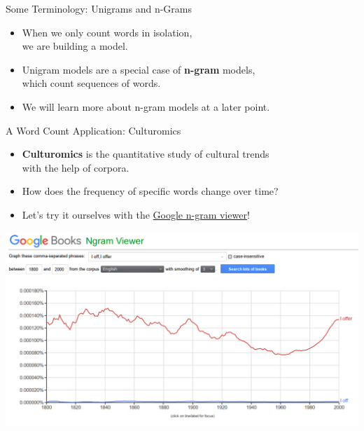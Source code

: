 \documentclass[professionalfonts, xcolor={usenames,svgnames,x11names,table}]{beamer}
\begin{document}
\begin{frame}{Some Terminology: Unigrams and n-Grams}
    \begin{itemize}
        \item When we only count words in isolation,\\
              we are building a  model.
        \item Unigram models are a special case of \textbf{n-gram} models,\\
              which count sequences of words.
        \item We will learn more about n-gram models at a later point.
    \end{itemize}
\end{frame}

\begin{frame}{A Word Count Application: Culturomics}
    \begin{itemize}
        \item \textbf{Culturomics} is the quantitative study of cultural trends\\
            with the help of corpora.
        \item How does the frequency of specific words change over time?
        \item Let's try it ourselves with the \href{https://books.google.com/ngrams}{Google n-gram viewer}!
    \end{itemize}

    \begin{center}
        \includegraphics[width=1\linewidth]{./img/bigram_Ioff_Ioffer}
    \end{center}
\end{frame}
\end{document}
